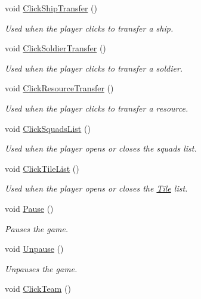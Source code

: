 \begin{DoxyCompactItemize}
void \hyperlink{class_custom_u_i_a2095392fa8c2062f807c34c5826cc8b2}{Click\+Ship\+Transfer} ()
\begin{DoxyCompactList}\small\item\em Used when the player clicks to transfer a ship. \end{DoxyCompactList}\item 
void \hyperlink{class_custom_u_i_a255c3e94af5531e732689fad0801abcf}{Click\+Soldier\+Transfer} ()
\begin{DoxyCompactList}\small\item\em Used when the player clicks to transfer a soldier. \end{DoxyCompactList}\item 
void \hyperlink{class_custom_u_i_aca37ce8e81373b5f24b3b6ee36adb37b}{Click\+Resource\+Transfer} ()
\begin{DoxyCompactList}\small\item\em Used when the player clicks to transfer a resource. \end{DoxyCompactList}\item 
void \hyperlink{class_custom_u_i_a6164fde2148a0fddb13238b0aeef1618}{Click\+Squads\+List} ()
\begin{DoxyCompactList}\small\item\em Used when the player opens or closes the squads list. \end{DoxyCompactList}\item 
void \hyperlink{class_custom_u_i_a008821c088a200e1b55eb1b042dd3d52}{Click\+Tile\+List} ()
\begin{DoxyCompactList}\small\item\em Used when the player opens or closes the \hyperlink{class_tile}{Tile} list. \end{DoxyCompactList}\item 
void \hyperlink{class_custom_u_i_a0cc4f99939c5d8d4a697ba8f03b1477d}{Pause} ()
\begin{DoxyCompactList}\small\item\em Pauses the game. \end{DoxyCompactList}\item 
void \hyperlink{class_custom_u_i_a3ab2f90f5ef8eeb8abd68633bfc421c6}{Unpause} ()
\begin{DoxyCompactList}\small\item\em Unpauses the game. \end{DoxyCompactList}\item 
void \hyperlink{class_custom_u_i_a7b23d5423b0a34a1619667d9407cc6d0}{Click\+Team} ()

\end{DoxyCompactItemize}
